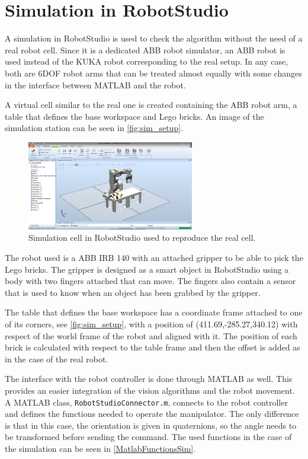 \chapter{Simulation in RobotStudio}\label{chap:simulation}
A simulation in RobotStudio \cite{robotStudio} is used to check the algorithm without the need of a real robot cell. Since it is a dedicated ABB robot simulator, an ABB robot is used instead of the KUKA robot corresponding to the real setup. In any case, both are 6DOF robot arms that can be treated almost equally with some changes in the interface between MATLAB and the robot. 

A virtual cell similar to the real one is created containing the ABB robot arm, a table that defines the base workspace and Lego bricks. An image of the simulation station can be seen in \autoref{fig:sim_setup}.
\begin{figure}[H]
    \includegraphics[width=0.65\textwidth]{figures/sim_setup}
    \caption{Simulation cell in RobotStudio used to reproduce the real cell.}
    \label{fig:sim_setup}
\end{figure}
%
The robot used is a ABB IRB 140 \cite{abb} with an attached gripper to be able to pick the Lego bricks. The gripper is designed as a smart object in RobotStudio using a body with two fingers attached that can move. The fingers also contain a sensor that is used to know when an object has been grabbed by the gripper.

The table that defines the base workspace has a coordinate frame attached to one of its corners, see \autoref{fig:sim_setup}, with a position of (411.69,-285.27,340.12) with respect of the world frame of the robot and aligned with it. The position of each brick is calculated with respect to the table frame and then the offset is added as in the case of the real robot.

The interface with the robot controller is done through MATLAB as well. This provides an easier integration of the vision algorithms and the robot movement. A MATLAB class, \lstinline[style=matlabinline]{RobotStudioConnector.m}, connects to the robot controller and defines the functions needed to operate the manipulator. The only difference is that in this case, the orientation is given in quaternions, so the angle needs to be transformed before sending the command. The used functions in the case of the simulation can be seen in \autoref{MatlabFunctionsSim}.

